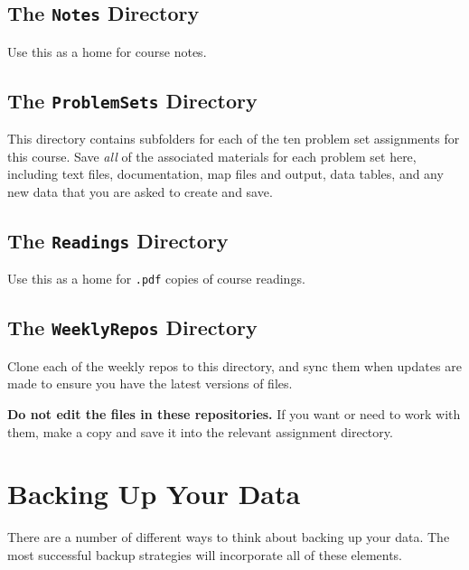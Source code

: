 \documentclass[]{book}
\theoremstyle{definition}
\theoremstyle{definition}
\theoremstyle{definition}
\theoremstyle{remark}
\begin{document}
\subsection{\texorpdfstring{The \texttt{Notes}
Directory}{The Notes Directory}}\label{the-notes-directory}

Use this as a home for course notes.

\subsection{\texorpdfstring{The \texttt{ProblemSets}
Directory}{The ProblemSets Directory}}\label{the-problemsets-directory}

This directory contains subfolders for each of the ten problem set
assignments for this course. Save \emph{all} of the associated materials
for each problem set here, including text files, documentation, map
files and output, data tables, and any new data that you are asked to
create and save.

\subsection{\texorpdfstring{The \texttt{Readings}
Directory}{The Readings Directory}}\label{the-readings-directory}

Use this as a home for \texttt{.pdf} copies of course readings.

\subsection{\texorpdfstring{The \texttt{WeeklyRepos}
Directory}{The WeeklyRepos Directory}}\label{the-weeklyrepos-directory}

Clone each of the weekly repos to this directory, and sync them when
updates are made to ensure you have the latest versions of files.

\textbf{Do not edit the files in these repositories.} If you want or
need to work with them, make a copy and save it into the relevant
assignment directory.

\section{Backing Up Your Data}\label{backing-up-your-data}

There are a number of different ways to think about backing up your
data. The most successful backup strategies will incorporate all of
these elements.
\end{document}
